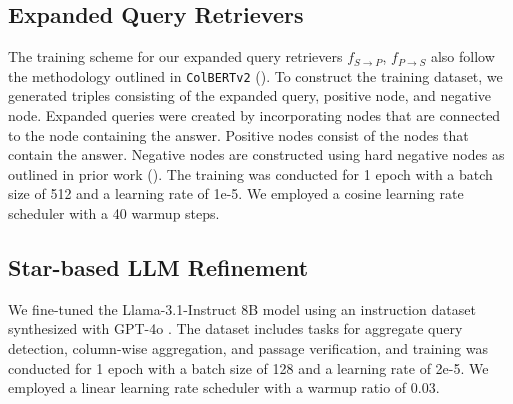 \subsection{Expanded Query Retrievers}
\label{sec:expanded_query_retrievers}

The training scheme for our expanded query retrievers $f_{S\rightarrow P}$, $f_{P\rightarrow S}$ also follow the methodology outlined in \texttt{ColBERTv2} (\citealt{ColBERTv2}).
To construct the training dataset, we generated triples consisting of the expanded query, positive node, and negative node. 
Expanded queries were created by incorporating nodes that are connected to the node containing the answer. 
Positive nodes consist of the nodes that contain the answer. Negative nodes are constructed using hard negative nodes as outlined in prior work (\citealt{COS}). The training was conducted for 1 epoch with a batch size of 512 and a learning rate of 1e-5. We employed a cosine learning rate scheduler with a 40 warmup steps.


\subsection{Star-based LLM Refinement}
\label{sec:star_based_llm_refinement_finetune}
We fine-tuned the Llama-3.1-Instruct 8B model \cite{dubey2024llama} using an instruction dataset synthesized with GPT-4o \cite{hurst2024gpt}. The dataset includes tasks for aggregate query detection, column-wise aggregation, and passage verification, and training was conducted for 1 epoch with a batch size of 128 and a learning rate of 2e-5. We employed a linear learning rate scheduler with a warmup ratio of 0.03.


